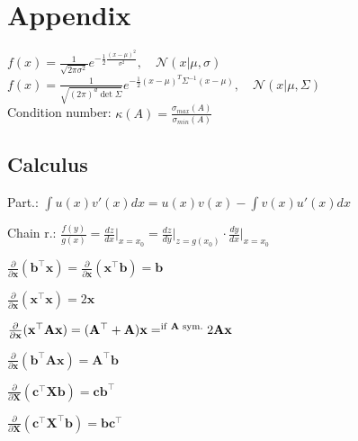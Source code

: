 \section{Appendix}
$f(x) = \frac{1}{\sqrt{2\pi \sigma^2}} e^{- \frac{1}{2} \frac{(x-\mu)^2}{\sigma^2}},\quad \mathcal{N}(x|\mu, \sigma)$\\
$f(x) = \frac{1}{\sqrt{(2\pi)^d\det\Sigma}} e^{- \frac{1}{2} (x-\mu)^T \Sigma^{-1} (x-\mu)},\quad \mathcal{N}(x|\mu, \Sigma)$\\
Condition number: $\kappa(A)=\frac{\sigma_{max}(A)}{\sigma_{min}(A)}$
\subsection*{Calculus}
\begin{inparaitem}[\color{red}\textbullet]
	\item Part.: $\int u(x)v'(x) dx = u(x)v(x) - \int v(x)u'(x) dx$\\
	\item Chain r.: $\frac{f(y)}{g(x)} = \frac{dz}{dx} \Big|_{x=x_0}= \frac{dz}{dy}\Big|_{z=g(x_0)}\cdot \frac{dy}{dx} \Big|_{x=x_0}$ \\
	\item $\frac{\partial}{\partial \mathbf{x}}(\mathbf{b}^\top \mathbf{x}) = \frac{\partial}{\partial \mathbf{x}}(\mathbf{x}^\top \mathbf{b}) = \mathbf{b}$
	\item $\frac{\partial}{\partial \mathbf{x}}(\mathbf{x}^\top \mathbf{x}) = 2\mathbf{x}$
	\item $\frac{\partial}{\partial \mathbf{x}}(\mathbf{x}^\top \mathbf{A}\mathbf{x}) = (\mathbf{A}^\top + \mathbf{A})\mathbf{x} =^{\text{if \textbf{A} sym.}} 2\mathbf{A}\mathbf{x}$
	\item $\frac{\partial}{\partial \mathbf{x}}(\mathbf{b}^\top \mathbf{A}\mathbf{x}) = \mathbf{A}^\top \mathbf{b}$
	\item $\frac{\partial}{\partial \mathbf{X}}(\mathbf{c}^\top \mathbf{X} \mathbf{b}) = \mathbf{c}\mathbf{b}^\top$
	\item $\frac{\partial}{\partial \mathbf{X}}(\mathbf{c}^\top \mathbf{X}^\top \mathbf{b}) = \mathbf{b}\mathbf{c}^\top$

\end{inparaitem}
